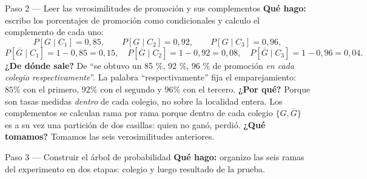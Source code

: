 \documentclass[11pt]{article}
\begin{document}
\begin{sol}
\begin{paso}{Paso 2 --- Leer las verosimilitudes de promoci\'on y sus complementos}
\textbf{Qu\'e hago:} escribo los porcentajes de promoci\'on como condicionales y calculo el complemento de cada uno:
\[
P[G\mid C_1]=0{,}85,\qquad P[G\mid C_2]=0{,}92,\qquad P[G\mid C_3]=0{,}96,
\]
\[
P[\overline{G}\mid C_1]=1-0{,}85=0{,}15,\quad
P[\overline{G}\mid C_2]=1-0{,}92=0{,}08,\quad
P[\overline{G}\mid C_3]=1-0{,}96=0{,}04 .
\]
\textbf{¿De d\'onde sale?} De ``se obtuvo un 85 \%, 92 \%, 96 \% de promoci\'on \emph{en cada colegio respectivamente}''. La palabra ``respectivamente'' fija el emparejamiento: $85\%$ con el primero, $92\%$ con el segundo y $96\%$ con el tercero.
\textbf{¿Por qu\'e?} Porque son tasas medidas \emph{dentro} de cada colegio, no sobre la localidad entera. Los complementos se calculan rama por rama porque dentro de cada colegio $\{G,\overline{G}\}$ es a su vez una partici\'on de dos casillas: quien no gan\'o, perdi\'o.
\textbf{¿Qu\'e tomamos?} Tomamos las seis verosimilitudes anteriores.
\end{paso}

\begin{paso}{Paso 3 --- Construir el \'arbol de probabilidad}
\textbf{Qu\'e hago:} organizo las seis ramas del experimento en dos etapas: colegio y luego resultado de la prueba.

\begin{center}
\shorthandoff{<>}
\shorthandon{<>}
\end{center}


\end{paso}
\end{sol}
\end{document}

